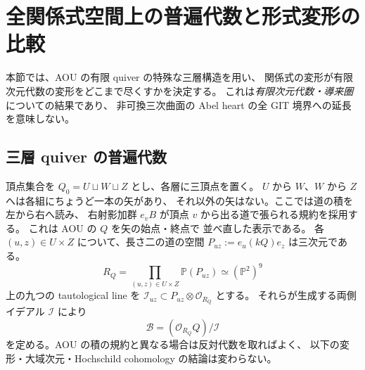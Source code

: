 \section{全関係式空間上の普遍代数と形式変形の比較}
\label{sec:aou-universal}
本節では、AOU の有限 quiver の特殊な三層構造を用い、
関係式の変形が有限次元代数の変形をどこまで尽くすかを決定する。
これは\emph{有限次元代数・導来圏}についての結果であり、
非可換三次曲面の Abel heart の全 GIT 境界への延長を意味しない。

\subsection{三層 quiver の普遍代数}
頂点集合を $Q_0=U\sqcup W\sqcup Z$ とし、各層に三頂点を置く。
$U$ から $W$、$W$ から $Z$ へは各組にちょうど一本の矢があり、
それ以外の矢はない。ここでは道の積を左から右へ読み、
右射影加群 $e_vB$ が頂点 $v$ から出る道で張られる規約を採用する。
これは AOU の $Q$ を矢の始点・終点で
並べ直した表示である\cite[\S4.2, Figure~4.1]{AOU}。
各 $(u,z)\in U\times Z$ について、長さ二の道の空間
$P_{uz}:=e_u(kQ)e_z$ は三次元である。
\[
 R_Q=\prod_{(u,z)\in U\times Z}\mathbb P(P_{uz})
       \simeq(\mathbb P^2)^9
\]
上の九つの tautological line を $\mathscr I_{uz}\subset
P_{uz}\otimes\mathcal O_{R_Q}$ とする。
それらが生成する両側イデアル $\mathscr I$ により
\[
 \mathscr B=(\mathcal O_{R_Q}Q)/\mathscr I
\]
を定める。AOU の積の規約と異なる場合は反対代数を取ればよく、
以下の変形・大域次元・Hochschild cohomology の結論は変わらない。

